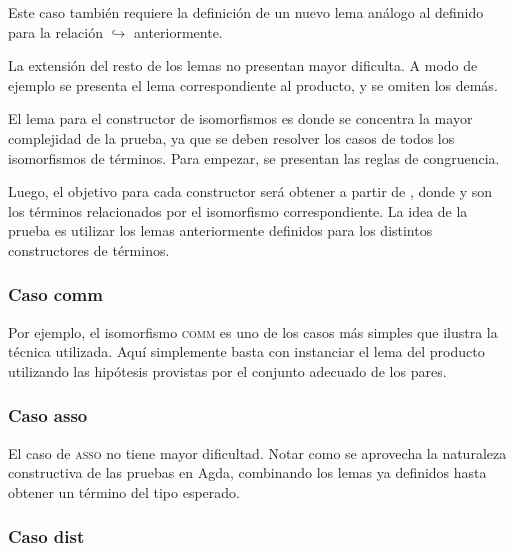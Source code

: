\documentclass[]{report}
\begin{document}
	
	Este caso también requiere la definición de un nuevo lema análogo al definido para la relación $\hookrightarrow$ anteriormente.
	
	
	La extensión del resto de los lemas no presentan mayor dificulta.
	A modo de ejemplo se presenta el lema correspondiente al producto, y se omiten los demás.
	
	
	El lema para el constructor de isomorfismos es donde se concentra la mayor complejidad de la prueba, ya que se deben resolver los casos de todos los isomorfismos de términos.
	Para empezar, se presentan las reglas de congruencia.
	
	
	Luego, el objetivo para cada constructor será obtener \snstar{} a partir de \snstar{}, donde  y  son los términos relacionados por el isomorfismo correspondiente.
	La idea de la prueba es utilizar los lemas anteriormente definidos para los distintos constructores de términos.
	
	\subsubsection{Caso comm}
	
	Por ejemplo, el isomorfismo \textsc{comm} es uno de los casos más simples que ilustra la técnica utilizada.
	Aquí simplemente basta con instanciar el lema del producto utilizando las hipótesis provistas por el conjunto adecuado de los pares.
	
	
	\subsubsection{Caso asso}
	
	El caso de \textsc{asso} no tiene mayor dificultad.
	Notar como se aprovecha la naturaleza constructiva de las pruebas en Agda, combinando los lemas ya definidos hasta obtener un término del tipo esperado.
	
	
	\subsubsection{Caso dist}
	
\end{document}
